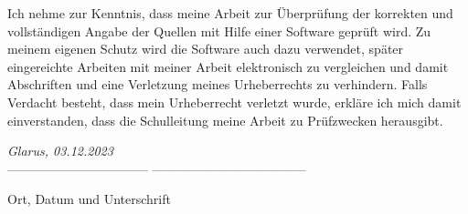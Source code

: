 \documentclass[12pt, a4paper, titlepage]{report}
\begin{document}
Ich nehme zur Kenntnis, dass meine Arbeit zur Überprüfung der korrekten und
vollständigen Angabe der Quellen mit Hilfe einer Software geprüft wird. Zu meinem
eigenen Schutz wird die Software auch dazu verwendet, später eingereichte Arbeiten mit meiner Arbeit elektronisch zu vergleichen und damit Abschriften und
eine Verletzung meines Urheberrechts zu verhindern. Falls Verdacht besteht, dass
mein Urheberrecht verletzt wurde, erkläre ich mich damit einverstanden, dass die
Schulleitung meine Arbeit zu Prüfzwecken herausgibt.

\vspace{2.0cm}
\emph{Glarus, 03.12.2023}\\
--------------------------------- ------------------------------------

Ort, Datum und Unterschrift

\end{document}
